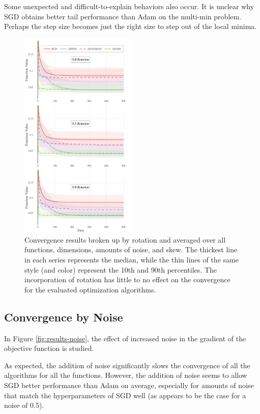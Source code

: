 \documentclass[conference]{ieeeconf}  %
\begin{document}
Some unexpected and difficult-to-explain behaviors also occur.  It is
unclear why SGD obtains better tail performance than Adam on the
multi-min problem. Perhaps the step size becomes just the right
size to step out of the local minima.

\begin{figure}
  \centering
  \includegraphics[width=0.5\textwidth]{Figures/final-rotation}
  \caption{Convergence results broken up by rotation and averaged over
    all functions, dimensions, amounts of noise, and skew. The
    thickest line in each series represents the median, while the thin
    lines of the same style (and color) represent the 10th and 90th
    percentiles. The incorporation of rotation has little to no effect
    on the convergence for the evaluated optimization algorithms.}
  \label{fig:results-rotation}
\end{figure}


\subsection{Convergence by Noise}

In Figure \ref{fig:results-noise}, the effect of increased noise in
the gradient of the objective function is studied.

As expected, the addition of noise significantly slows the convergence
of all the algorithms for all the functions.  However, the addition of
noise seems to allow SGD better performance than Adam on average,
especially for amounts of noise that match the hyperparameters of SGD
well (as appears to be the case for a noise of 0.5).
\end{document}
